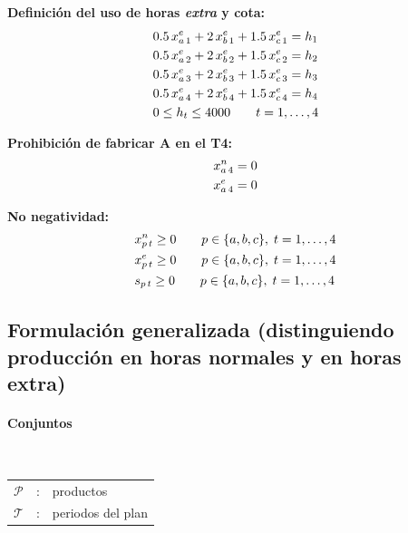 \textbf{Definición del uso de horas \emph{extra} y cota:}
\begin{align}
& 0.5\,x^{e}_{a\,1} + 2\,x^{e}_{b\,1} + 1.5\,x^{e}_{c\,1} = h_1 \notag\\
& 0.5\,x^{e}_{a\,2} + 2\,x^{e}_{b\,2} + 1.5\,x^{e}_{c\,2} = h_2 \notag\\
& 0.5\,x^{e}_{a\,3} + 2\,x^{e}_{b\,3} + 1.5\,x^{e}_{c\,3} = h_3 \notag\\
& 0.5\,x^{e}_{a\,4} + 2\,x^{e}_{b\,4} + 1.5\,x^{e}_{c\,4} = h_4 \notag\\
& 0 \le h_t \le 4000 \qquad t=1,\dots,4 \notag
\end{align}

\textbf{Prohibición de fabricar A en el T4:}
\begin{align}
& x^{n}_{a\,4} = 0 \notag\\
& x^{e}_{a\,4} = 0 \notag
\end{align}

\textbf{No negatividad:}
\begin{align}
& x^{n}_{p\,t} \ge 0 \qquad p\in\{a,b,c\},\; t=1,\dots,4 \notag\\
& x^{e}_{p\,t} \ge 0 \qquad p\in\{a,b,c\},\; t=1,\dots,4 \notag\\
& s_{p\,t} \ge 0 \qquad p\in\{a,b,c\},\; t=1,\dots,4 \notag
\end{align}



\subsection{Formulación generalizada (distinguiendo producción en horas normales y en horas extra)}

\paragraph{Conjuntos}\mbox{}\\
\begin{tabular}{l c l}
    $\mathcal{P}$ & : & productos \\
    $\mathcal{T}$ & : & periodos del plan \\
\end{tabular}
\\
\\


